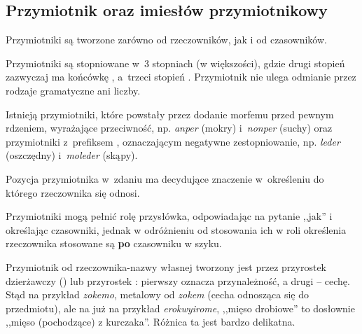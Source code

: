 \begin{spacing}{1.1}


\subsection{Przymiotnik oraz imiesłów przymiotnikowy}

Przymiotniki są tworzone zarówno od rzeczowników, jak i od czasowników.

Przymiotniki są stopniowane w~3 stopniach (w większości), gdzie drugi stopień
zazwyczaj ma końcówkę , a~trzeci stopień . Przymiotnik nie
ulega odmianie przez rodzaje gramatyczne ani liczby.

Istnieją przymiotniki, które powstały przez dodanie morfemu  przed
pewnym rdzeniem, wyrażające przeciwność, np. \emph{anper}  (mokry)
i~\emph{nonper}  (suchy) oraz przymiotniki z~prefiksem ,
oznaczającym negatywne zestopniowanie, np. \emph{leder}  (oszczędny)
i~\emph{moleder}  (skąpy).

Pozycja przymiotnika w~zdaniu ma decydujące znaczenie w~określeniu do którego
rzeczownika się odnosi.




Przymiotniki mogą pełnić rolę przysłówka, odpowiadając na pytanie ,,jak'' i
określając czasowniki, jednak w odróżnieniu od stosowania ich w roli określenia
rzeczownika stosowane są \textbf{po} czasowniku w szyku.


Przymiotnik od rzeczownika-nazwy własnej tworzony jest przez przyrostek
dzierżawczy  () lub przyrostek : pierwszy oznacza
przynależność, a drugi -- cechę. Stąd na przykład \emph{zokemo}, metalowy od
\emph{zokem} (cecha odnosząca się do przedmiotu), ale na już na przykład
\emph{erokwyirome}, ,,mięso drobiowe'' to dosłownie ,,mięso (pochodzące) z
kurczaka''. Różnica ta jest bardzo delikatna.


\end{spacing}
